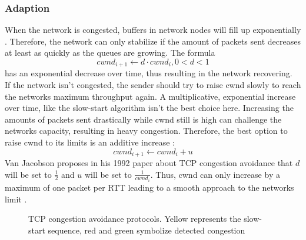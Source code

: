 \documentclass[a4paper,conference]{IEEEtran}
\begin{document}
\subsubsection*{Adaption}
When the network is congested, buffers in network nodes will fill up exponentially \cite{jacobson1992tcp}. Therefore, the network can only stabilize if the amount of packets sent decreases at least as quickly as the queues are growing. The formula \cite{jacobson1992tcp} \[cwnd_{i+1} \leftarrow d \cdot cwnd_{i}, 0<d<1\] has an exponential decrease over time, thus resulting in the network recovering.\\
If the network isn't congested, the sender should try to raise cwnd slowly to reach the networks maximum throughput again. A multiplicative, exponential increase over time, like the slow-start algorithm isn't the best choice here. Increasing the amounts of packets sent drastically while cwnd still is high can challenge the networks capacity, resulting in heavy congestion. Therefore, the best option to raise cwnd to its limits is an additive increase \cite{jacobson1992tcp}:\[cwnd_{i+1} \leftarrow cwnd_{i} + u\] Van Jacobson proposes in his 1992 paper about TCP congestion avoidance that $d$ will be set to $\frac{1}{2}$ and $u$ will be set to $\frac{1}{cwnd_{i}}$. Thus, cwnd can only increase by a maximum of one packet per RTT leading to a smooth approach to the networks limit \cite{jacobson1992tcp}.

\begin{figure}
  \centering
  \caption{TCP congestion avoidance protocols. Yellow represents the slow-start sequence, red and green symbolize detected congestion}
  \label{fig:tcp_congestion_avoidance_protocols}
\end{figure}
\end{document}
